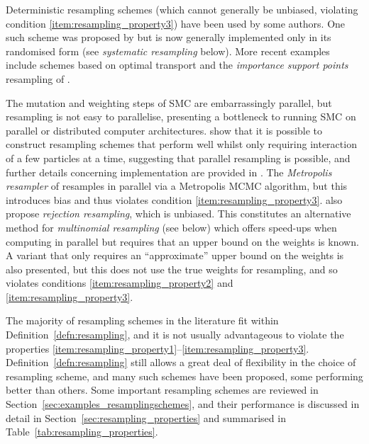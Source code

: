 Deterministic resampling schemes (which cannot generally be unbiased, violating condition \ref{item:resampling_property3}) have been used by some authors. One such scheme was proposed by \textcite{kitagawa1996} but is now generally implemented only in its randomised form (see \emph{systematic resampling} below). More recent examples include schemes based on optimal transport \parencite{reich2013, myers2021, corenflos2021} and the \emph{importance support points} resampling of \textcite{huang2020}.

The mutation and weighting steps of SMC are embarrassingly parallel, but resampling is not easy to parallelise, presenting a bottleneck to running SMC on parallel or distributed computer architectures. %
\textcite{whiteley2016} show that it is possible to construct resampling schemes that perform well whilst only requiring interaction of a few particles at a time, suggesting that parallel resampling is possible, and further details concerning implementation are provided in \textcite{lee2016}.
The \emph{Metropolis resampler} of \textcite{murray2016} resamples in parallel via a Metropolis MCMC algorithm, but this introduces bias and thus violates condition \ref{item:resampling_property3}. 
\textcite{murray2016} also propose \emph{rejection resampling}, which is unbiased. This constitutes an alternative method for \emph{multinomial resampling} (see below) which offers speed-ups when computing in parallel but requires that an upper bound on the weights is known.
A variant that only requires an ``approximate'' upper bound on the weights is also presented, but this does not use the true weights for resampling, and so violates conditions \ref{item:resampling_property2} and \ref{item:resampling_property3}.

The majority of resampling schemes in the literature fit within Definition~\ref{defn:resampling}, and it is not usually advantageous to violate the properties \ref{item:resampling_property1}--\ref{item:resampling_property3}.
Definition~\ref{defn:resampling} still allows a great deal of flexibility in the choice of resampling scheme, and many such schemes have been proposed, some performing better than others. 
Some important resampling schemes are reviewed in Section~\ref{sec:examples_resamplingschemes}, and their performance is discussed in detail in Section~\ref{sec:resampling_properties} and summarised in Table~\ref{tab:resampling_properties}.





